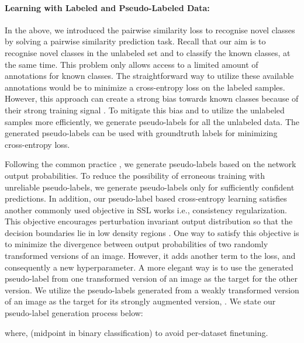 \documentclass[runningheads]{eccv2022submission}
\begin{document}
\paragraph{\textbf{Learning with Labeled and Pseudo-Labeled Data:}}
In the above, we introduced the pairwise similarity loss to recognise novel classes by solving a pairwise similarity prediction task. Recall that our aim is to recognise novel classes in the unlabeled set and to classify the known classes, at the same time. This problem only allows access to a limited amount of annotations for known classes. The straightforward way to utilize these available annotations would be to minimize a cross-entropy loss on the labeled samples. However, this approach can create a strong bias towards known classes because of their strong training signal \cite{cao2022openworld}. To mitigate this bias and to utilize the unlabeled samples more efficiently, we generate pseudo-labels for all the unlabeled data. The generated pseudo-labels can be used with groundtruth labels for minimizing cross-entropy loss.



Following the common practice \cite{Lee2013PseudoLabelT,arazo2020pseudo,rizve2021in}, we generate pseudo-labels based on the network output probabilities. To reduce the possibility of erroneous training with unreliable pseudo-labels, we generate pseudo-labels only for sufficiently confident predictions. In addition, our pseudo-label based cross-entropy learning satisfies another commonly used objective in SSL works i.e., consistency regularization. This objective encourages perturbation invariant output distribution so that the decision boundaries lie in low density regions \cite{chapelle2005semi,verma2019interpolation}. One way to satisfy this objective is to minimize the divergence between output probabilities of two randomly transformed versions of an image. However, it adds another term to the loss, and consequently a new hyperparameter. A more elegant way is to use the generated pseudo-label from one transformed version of an image as the target for the other version. We utilize the pseudo-labels generated from a weakly transformed version of an image  as the target for its strongly augmented version, . We state our pseudo-label generation process below:


\setlength{\abovedisplayskip}{-4pt}
\setlength{\belowdisplayskip}{4pt}
\setlength{\abovedisplayshortskip}{0pt}
\setlength{\belowdisplayshortskip}{0pt}

\noindent where,  (midpoint in binary classification) to avoid per-dataset finetuning.
\end{document}
